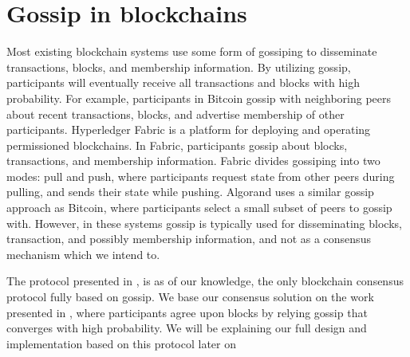 \documentclass[USenglish]{uit-thesis}
\begin{document}
\begin{code}
\end{code}


\fi



\section{Gossip in blockchains}

Most existing blockchain systems use some form of gossiping to disseminate transactions, blocks, and membership information.
By utilizing gossip, participants will eventually receive all transactions and blocks with high probability. 
For example, participants in Bitcoin gossip with neighboring peers about recent transactions, blocks, and advertise membership of other participants.
Hyperledger Fabric \cite{hyper} is a platform for deploying and operating permissioned blockchains. 
In Fabric, participants gossip about blocks, transactions, and membership information.
Fabric divides gossiping into two modes: pull and push, where participants request state from other peers during pulling, and sends their state while pushing.
Algorand \cite{algorand} uses a similar gossip approach as Bitcoin, where participants select a small subset of peers to gossip with. 
However, in these systems gossip is typically used for disseminating blocks, transaction, and possibly membership information, and not as a consensus mechanism which we intend to. 

The protocol presented in \cite{vanblock}, is as of our knowledge, the only blockchain consensus protocol fully based on gossip.
We base our consensus solution on the work presented in \cite{vanblock}, where participants agree upon blocks by relying gossip that converges with high probability.
We will be explaining our full design and implementation based on this protocol later on
\end{document}
